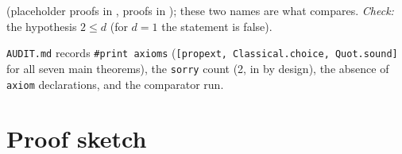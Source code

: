 \documentclass[11pt]{article}
\theoremstyle{definition}
\theoremstyle{remark}
\begin{document}
\begin{table}[t]
\begin{lrbox}{\auditbox}
\begin{minipage}{0.955\textwidth}
\begin{enumerate}[leftmargin=1.6em,itemsep=0pt,topsep=2pt]
 (placeholder proofs in , proofs in ); these two names are what  compares.
 \emph{Check:} the hypothesis $2\le d$ (for $d=1$ the statement is false).
\end{enumerate}
\texttt{AUDIT.md} records \texttt{\#print axioms} (\texttt{[propext, Classical.choice, Quot.sound]} for all seven main theorems), the
\texttt{sorry} count (2, in  by design), the absence of \texttt{axiom} declarations, and the comparator run.
\end{minipage}\end{lrbox}\noindent\fbox{\usebox{\auditbox}}
\end{table}

\section{Proof sketch}\label{s:sketch}
\end{document}
